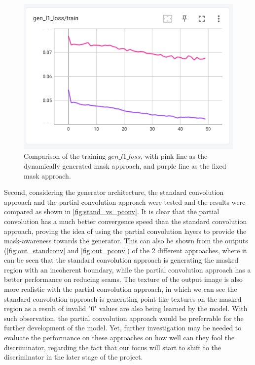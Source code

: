 \documentclass[10pt,twocolumn,letterpaper]{article}
\begin{document}
\begin{figure}[t]
    \centering
    \includegraphics[width=\linewidth]{figures/milestone/gen_vs_fix.png}
    \caption{Comparison of the training $gen\_l1\_loss$, with pink line as the dynamically generated mask approach, and purple line as the fixed mask approach.}
    \label{fig:gen_vs_fix}
\end{figure}

Second, considering the generator architecture, the standard convolution approach and the partial convolution approach were tested and the results were compared as shown in \cref{fig:stand_vs_pconv}. It is 
clear that the partial convolution has a much better convergence speed than the standard convolution approach, proving the idea of using the partial convolution layers to provide the mask-awareness towards 
the generator. This can also be shown from the outputs (\cref{fig:out_standconv} and \cref{fig:out_pconv}) of the 2 different approaches, where it can be seen that the standard convolution approach is 
generating the masked region with an incoherent boundary, while the partial convolution approach has a better performance on reducing seams. The texture of the output image is also more realistic with the 
partial convolution approach, in which we can see the standard convolution approach is generating point-like textures on the masked region as a result of invalid "0" values are also being learned by the model. 
With such observation, the partial convolution approach would be preferrable for the further development of the model. Yet, further investigation may be needed to evaluate the performance on these approaches 
on how well can they fool the discriminator, regarding the fact that our focus will start to shift to the discriminator in the later stage of the project.
\end{document}
